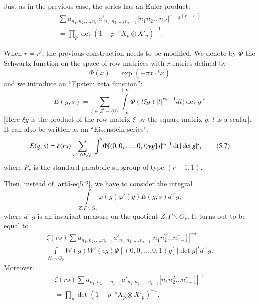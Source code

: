 Just as in the previous case, the series has an Euler product:
\begin{gather*}
\sum a_{n_{1},n_{2},\ldots,n_{r'}}a'_{n_{1},n_{2},\ldots,n_{r'-1}}|n_{1}n_{2}\ldots n_{r'}|^{s-\frac{1}{2}(r-r')}\tag{5.4}\label{art5-eq5.4}\\
=\prod\limits_{p}\det (1-p^{-s}X_{p}\otimes X'_{p})^{-1}.
\end{gather*}

When $r=r'$, the previous construction needs to be modified. We denote by $\Phi$ the Schwartz-function on the space of row matrices with $r$ entries defined by
\begin{equation*}
\Phi (x)=\exp (-\pi x\cdot {}^{t}x)\tag{5.5}\label{art5-eq5.5}
\end{equation*}
and we introduce an ``Epstein zeta function'':
\begin{equation*}
E(g,s)=\sum\limits_{\xi\in Z^{r}-\{0\}}\int\limits_{-\infty}^{+\infty}\Phi (t\xi g)|t|^{rs-1}dt|\det g|^{s}\tag{5.6}\label{art5-eq5.6}
\end{equation*}
[Here $\xi g$ is the product of the row matrix $\xi$ by the square matrix $g$; $t$ is a scalar]. It can also be written as an ``Eisenstein series'':
\begin{equation*}
E(g,s)=\zeta(rs)\sum\limits_{\gamma\in \Gamma\cap P_{r}\backslash \Gamma} \int \Phi [(0,0,\ldots,0,t)\gamma g]|t|^{rs-1}\operatorname{dt}|\det g|^{s},\tag{5.7}\label{art5-eq5.7}
\end{equation*}
where $P_{r}$ is the standard parabolic subgroup of type $(r-1,1)$.

Then, instead of \eqref{art5-eq5.2}, we have to consider the integral
\begin{equation*}
\int\limits_{Z_{r}\Gamma\backslash G_{r}}\varphi(g)\varphi'(g)E(g,s)d^{\times}g,\tag{5.8}\label{art5-eq5.8}
\end{equation*}
where $d^{\times}g$ is an invariant measure on the quotient $Z_{r}\Gamma\backslash G_{r}$. It turns out to be equal to
\begin{gather*}
\zeta(rs)\sum a_{n_{1},n_{2},\ldots,n_{r-1}}a'_{n_{1},n_{2},\ldots,n_{r-1}}|n_{1}n^{2}_{2}\ldots n_{r-1}^{r-1}|^{-s}\tag{5.9}\label{art5-eq5.9}\\
\int\limits_{N_{r}\backslash G_{r}}W(g)W'(\epsilon g)\Phi[(0,0,\ldots,0,1)g]|\det g|^{s}d^{\times} g.
\end{gather*}
Moreover:\pageoriginale
\begin{gather*}
\zeta(rs)\sum a_{n_{1},n_{2},\ldots,n_{r-1}}a'_{n_{1},n_{2},\ldots,n_{r-1}}|n_{1}n^{2}_{2}\ldots n_{r-1}^{r-1}|^{-s}\tag{5.10}\label{art5-eq5.10}\\
=\prod\limits_{p}\det (1-p^{-s}X_{p}\otimes X'_{p})^{-1}.
\end{gather*}

